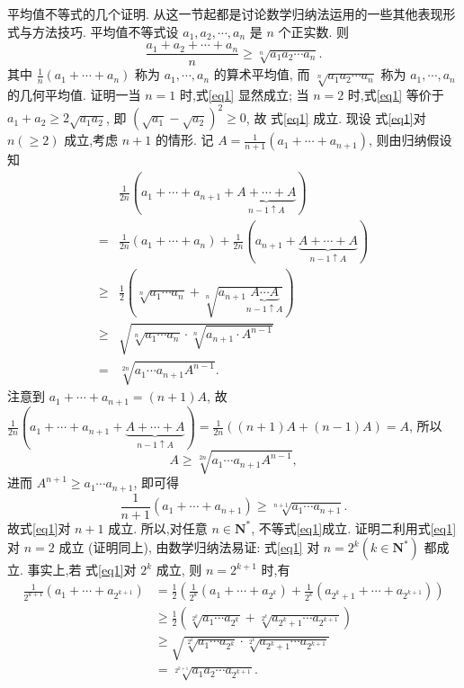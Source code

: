 
平均值不等式的几个证明.
从这一节起都是讨论数学归纳法运用的一些其他表现形式与方法技巧.
平均值不等式设 $a_1, a_2, \cdots, a_n$ 是 $n$ 个正实数.
则
$$
\frac{a_1+a_2+\cdots+a_n}{n} \geqslant \sqrt[n]{a_1 a_2 \cdots a_n} . \label{eq1}
$$
其中 $\frac{1}{n}\left(a_1+\cdots+a_n\right)$ 称为 $a_1, \cdots, a_n$ 的算术平均值, 而 $\sqrt[n]{a_1 a_2 \cdots a_n}$ 称为 $a_1, \cdots, a_n$ 的几何平均值.
证明一当 $n=1$ 时,式\ref{eq1} 显然成立; 当 $n=2$ 时,式\ref{eq1} 等价于 $a_1+a_2 \geqslant 2 \sqrt{a_1 a_2}$, 即 $\left(\sqrt{a_1}-\sqrt{a_2}\right)^2 \geqslant 0$, 故 式\ref{eq1} 成立.
现设 式\ref{eq1}对 $n(\geqslant 2)$ 成立,考虑 $n+1$ 的情形.
记 $A=\frac{1}{n+1}\left(a_1+\cdots+a_{n+1}\right)$, 则由归纳假设知
$$
\begin{aligned}
& \frac{1}{2 n}(a_1+\cdots+a_{n+1}+\underbrace{A+\cdots+A}_{n-1 \uparrow A}) \\
= & \frac{1}{2 n}\left(a_1+\cdots+a_n\right)+\frac{1}{2 n}(a_{n+1}+\underbrace{A+\cdots+A}_{n-1 \uparrow A}) \\
\geqslant & \frac{1}{2}\left(\sqrt[n]{a_1 \cdots a_n}+\sqrt[n]{a_{n+1} \underbrace{A \cdots A}_{n-1 \uparrow A}}\right) \\
\geqslant & \sqrt{\sqrt[n]{a_1 \cdots a_n} \cdot \sqrt[n]{a_{n+1} \cdot A^{n-1}}} \\
= & \sqrt[2 n]{a_1 \cdots a_{n+1} A^{n-1}} .
\end{aligned}
$$
注意到 $a_1+\cdots+a_{n+1}=(n+1) A$, 故 $\frac{1}{2 n}(a_1+\cdots+a_{n+1}+\underbrace{A+\cdots+A}_{n-1 \uparrow A})= \frac{1}{2 n}((n+1) A+(n-1) A)=A$, 所以
$$
A \geqslant \sqrt[2 n]{a_1 \cdots a_{n+1} A^{n-1}},
$$
进而 $A^{n+1} \geqslant a_1 \cdots a_{n+1}$, 即可得
$$
\frac{1}{n+1}\left(a_1+\cdots+a_{n+1}\right) \geqslant \sqrt[n+1]{a_1 \cdots a_{n+1}} .
$$
故式\ref{eq1}对 $n+1$ 成立.
所以,对任意 $n \in \mathbf{N}^*$, 不等式\ref{eq1}成立.
证明二利用式\ref{eq1}对 $n=2$ 成立 (证明同上), 由数学归纳法易证: 式\ref{eq1} 对 $n= 2^k\left(k \in \mathbf{N}^*\right)$ 都成立.
事实上,若 式\ref{eq1}对 $2^k$ 成立, 则 $n=2^{k+1}$ 时,有
$$
\begin{aligned}
\frac{1}{2^{k+1}}\left(a_1+\cdots+a_{2^{k+1}}\right) & =\frac{1}{2}\left(\frac{1}{2^k}\left(a_1+\cdots+a_{2^k}\right)+\frac{1}{2^k}\left(a_{2^k+1}+\cdots+a_{2^{k+1}}\right)\right) \\
& \geqslant \frac{1}{2}\left(\sqrt[2^k]{a_1 \cdots a_{2^k}}+\sqrt[2^k]{a_{2^k+1} \cdots a_{2^{k+1}}}\right) \\
& \geqslant \sqrt{\sqrt[2^k]{a_1 \cdots a_{2^k}} \cdot \sqrt[2^k]{a_{2^k+1} \cdots a_{2^{k+1}}}} \\
& =\sqrt[2^{k+1}]{a_1 a_2 \cdots a_{2^{k+1}}} .
\end{aligned}
$$
